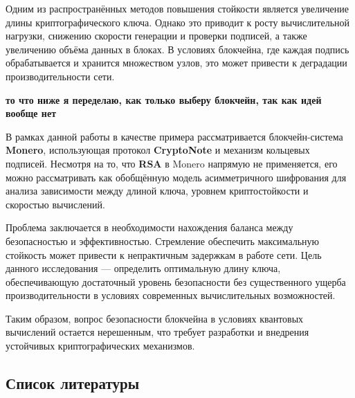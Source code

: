 \documentclass[a4paper]{article}
\begin{document}
Одним из распространённых методов повышения стойкости является увеличение длины криптографического ключа. Однако это приводит к росту вычислительной нагрузки, снижению скорости генерации и проверки подписей, а также увеличению объёма данных в блоках. В условиях блокчейна, где каждая подпись обрабатывается и хранится множеством узлов, это может привести к деградации производительности сети.

\textbf{то что ниже я переделаю, как только выберу блокчейн, так как идей вообще нет}

 
В рамках данной работы в качестве примера рассматривается блокчейн-система \textbf{Monero}, использующая протокол \textbf{CryptoNote} и механизм кольцевых подписей. Несмотря на то, что \textbf{RSA} в Monero напрямую не применяется, его можно рассматривать как обобщённую модель асимметричного шифрования для анализа зависимости между длиной ключа, уровнем криптостойкости и скоростью вычислений. 


Проблема заключается в необходимости нахождения баланса между безопасностью и эффективностью. Стремление обеспечить максимальную стойкость может привести к непрактичным задержкам в работе сети. Цель данного исследования — определить оптимальную длину ключа, обеспечивающую достаточный уровень безопасности без существенного ущерба производительности в условиях современных вычислительных возможностей.

Таким образом, вопрос безопасности блокчейна в условиях квантовых вычислений остается нерешенным, что требует разработки и внедрения устойчивых криптографических механизмов.
\newpage
\begin{center}
\section*{Список литературы}
\end{center}

\vspace{1em}
\end{document}
